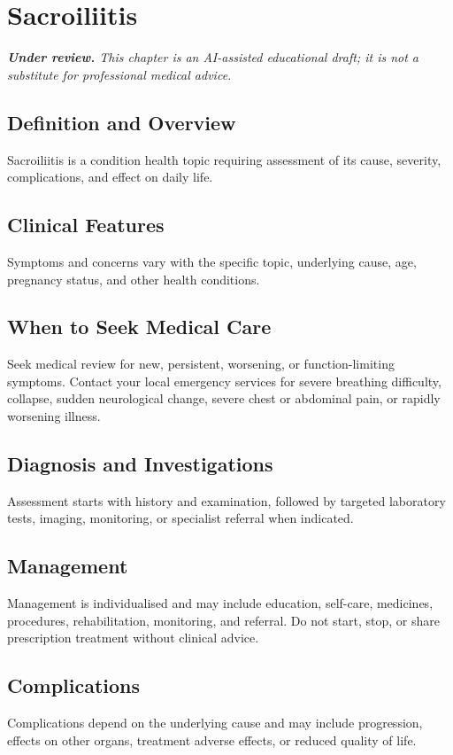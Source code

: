 \chapter{Sacroiliitis}

\medskip
\noindent\textit{\textbf{Under review.} This chapter is an AI-assisted educational draft; it is not a substitute for professional medical advice.}

\section*{Definition and Overview}
Sacroiliitis is a condition health topic requiring assessment of its cause, severity, complications, and effect on daily life.

\section*{Clinical Features}
Symptoms and concerns vary with the specific topic, underlying cause, age, pregnancy status, and other health conditions.

\section*{When to Seek Medical Care}
Seek medical review for new, persistent, worsening, or function-limiting symptoms. Contact your local emergency services for severe breathing difficulty, collapse, sudden neurological change, severe chest or abdominal pain, or rapidly worsening illness.

\section*{Diagnosis and Investigations}
Assessment starts with history and examination, followed by targeted laboratory tests, imaging, monitoring, or specialist referral when indicated.

\section*{Management}
Management is individualised and may include education, self-care, medicines, procedures, rehabilitation, monitoring, and referral. Do not start, stop, or share prescription treatment without clinical advice.

\section*{Complications}
Complications depend on the underlying cause and may include progression, effects on other organs, treatment adverse effects, or reduced quality of life.

